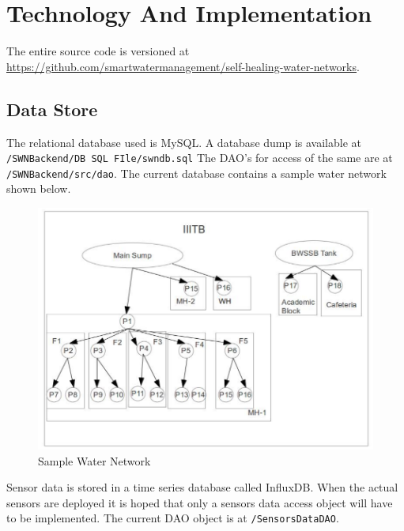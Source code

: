 \documentclass[11pt]{report} %
\begin{document}

\chapter{Technology And Implementation}
The entire source code is versioned at \\ \url {https://github.com/smartwatermanagement/self-healing-water-networks}.

\section{Data Store}
The relational database used is MySQL. A database dump is available at \texttt{/SWNBackend/DB SQL FIle/swndb.sql}
The DAO's for access of the same are at \texttt{/SWNBackend/src/dao}.
The current database contains a sample water network shown below.
\begin{figure}[h!]
\caption{Sample Water Network}
\centering
\includegraphics[scale=0.4]{samplenetworkcut.png}
\end{figure}

Sensor data is stored in a time series database called InfluxDB. When the actual sensors are deployed it is hoped that only a sensors data access object will have to be implemented. The current DAO object is at \texttt{/SensorsDataDAO}.
\end{document}

